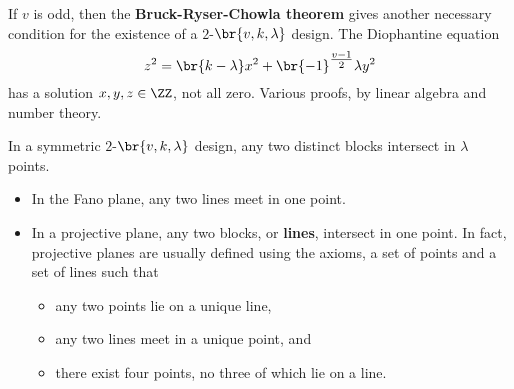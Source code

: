 \begin{note*}
If $ v $ is odd, then the \textbf{Bruck-Ryser-Chowla theorem} gives another necessary condition for the existence of a $ 2 $-$ \br{v, k, \lambda} $ design. The Diophantine equation
$$ z^2 = \br{k - \lambda}x^2 + \br{-1}^{\tfrac{v - 1}{2}}\lambda y^2 $$
has a solution $ x, y, z \in \ZZ $, not all zero. Various proofs, by linear algebra and number theory.
\end{note*}

\pagebreak

\begin{theorem}
\label{thm:3.9}
In a symmetric $ 2 $-$ \br{v, k, \lambda} $ design, any two distinct blocks intersect in $ \lambda $ points.
\end{theorem}

\begin{example*}
\hfill
\begin{itemize}
\item In the Fano plane, any two lines meet in one point.
\item In a projective plane, any two blocks, or \textbf{lines}, intersect in one point. In fact, projective planes are usually defined using the axioms, a set of points and a set of lines such that
\begin{itemize}
\item any two points lie on a unique line,
\item any two lines meet in a unique point, and
\item there exist four points, no three of which lie on a line.
\end{itemize}
\end{itemize}
\end{example*}


